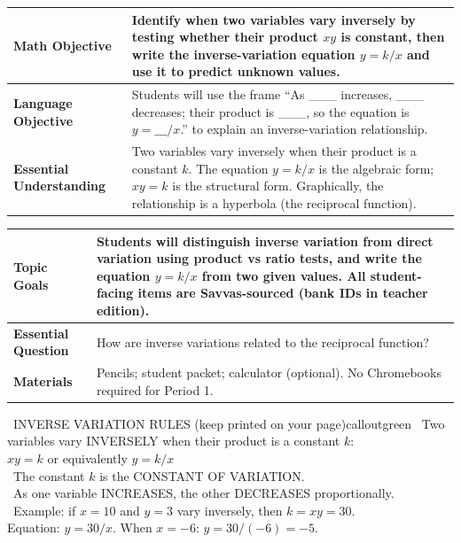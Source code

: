 \documentclass[11pt]{article}
\begin{document}

{\small
\renewcommand{\arraystretch}{1.25}
\noindent\begin{tabular}{|p{1.8in}|p{4.8in}|}
\hline
\textbf{Math Objective} & Identify when two variables vary inversely by testing whether their product \(xy\) is constant, then write the inverse-variation equation \(y = k/x\) and use it to predict unknown values. \\ \hline
\textbf{Language Objective} & Students will use the frame “As \_\_\_ increases, \_\_\_ decreases; their product is \_\_\_, so the equation is \(y = \_\_\_/x\).” to explain an inverse-variation relationship. \\ \hline
\textbf{Essential Understanding} & Two variables vary inversely when their product is a constant \(k\). The equation \(y = k/x\) is the algebraic form; \(xy = k\) is the structural form. Graphically, the relationship is a hyperbola (the reciprocal function). \\ \hline
\end{tabular}
}

{\small
\renewcommand{\arraystretch}{1.25}
\noindent\begin{tabular}{|p{1.8in}|p{4.8in}|}
\hline
\textbf{Topic Goals} & Students will distinguish inverse variation from direct variation using product vs ratio tests, and write the equation \(y = k/x\) from two given values. All student-facing items are Savvas-sourced (bank IDs in teacher edition). \\ \hline
\textbf{Essential Question} & How are inverse variations related to the reciprocal function? \\ \hline
\textbf{Materials} & Pencils; student packet; calculator (optional). No Chromebooks required for Period 1. \\ \hline
\end{tabular}
}


\begin{callout}{\IconBook\ INVERSE VARIATION RULES (keep printed on your page)}{calloutgreen}
\textbullet\ Two variables vary INVERSELY when their product is a constant \(k\):\\
\hspace*{1.6em}\(xy = k\) \hspace{1.5em} or equivalently \hspace{1.5em} \(y = k/x\)\\
\textbullet\ The constant \(k\) is the CONSTANT OF VARIATION.\\
\textbullet\ As one variable INCREASES, the other DECREASES proportionally.\\
\textbullet\ Example: if \(x = 10\) and \(y = 3\) vary inversely, then \(k = xy = 30\).\\
\hspace*{1.6em}Equation: \(y = 30/x\). When \(x = -6\): \(y = 30/(-6) = -5\).
\end{callout}
\end{document}
